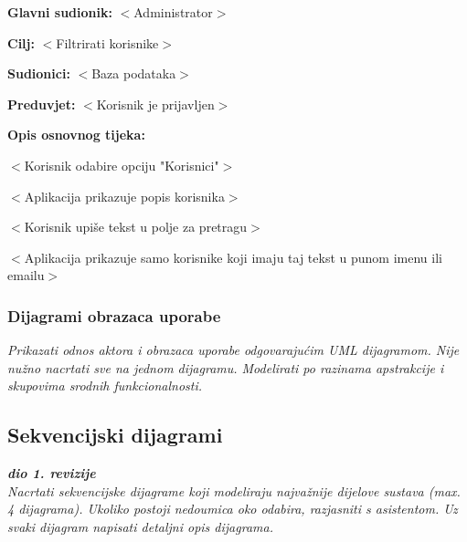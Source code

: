 					\noindent {}
					\begin{packed_item}

						\item \textbf{Glavni sudionik:} $<$Administrator$>$
						\item \textbf{Cilj:} $<$Filtrirati korisnike$>$
						\item \textbf{Sudionici:} $<$Baza podataka$>$
						\item \textbf{Preduvjet:} $<$Korisnik je prijavljen$>$
						\item \textbf{Opis osnovnog tijeka:}

						\item[] \begin{packed_enum}

							\item $<$Korisnik odabire opciju "Korisnici"$>$
							\item $<$Aplikacija prikazuje popis korisnika$>$
							\item $<$Korisnik upiše tekst u polje za pretragu$>$
							\item $<$Aplikacija prikazuje samo korisnike koji imaju taj tekst u punom imenu ili emailu$>$
						\end{packed_enum}
					\end{packed_item}
					
				\subsubsection{Dijagrami obrazaca uporabe}
					
					\textit{Prikazati odnos aktora i obrazaca uporabe odgovarajućim UML dijagramom. Nije nužno nacrtati sve na jednom dijagramu. Modelirati po razinama apstrakcije i skupovima srodnih funkcionalnosti.}
				\eject		
				
			\subsection{Sekvencijski dijagrami}
				
				\textbf{\textit{dio 1. revizije}}\\
				
				\textit{Nacrtati sekvencijske dijagrame koji modeliraju najvažnije dijelove sustava (max. 4 dijagrama). Ukoliko postoji nedoumica oko odabira, razjasniti s asistentom. Uz svaki dijagram napisati detaljni opis dijagrama.}
				\eject
	
